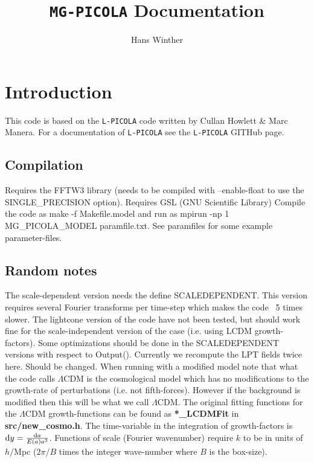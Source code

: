 \documentclass[usenatbib]{article}
\title{\texttt{MG-PICOLA} Documentation}
\author{Hans Winther}
\begin{document}
\maketitle

\section*{Introduction}

This code is based on the \texttt{L-PICOLA} code written by Cullan Howlett \& Marc Manera. For a documentation of \texttt{L-PICOLA} see the \texttt{L-PICOLA} GITHub page.

\subsection*{Compilation}
Requires the FFTW3 library (needs to be compiled with --enable-float to use the SINGLE\_PRECISION option).
\newline
\newline
Requires GSL (GNU Scientific Library)
\newline
\newline
Compile the code as make -f Makefile.model and run as mpirun -np 1 MG\_PICOLA\_MODEL paramfile.txt. See paramfiles for some example parameter-files.

\subsection*{Random notes}

The scale-dependent version needs the define SCALEDEPENDENT. This version requires several Fourier transforms per time-step which makes the code ~5 times slower.
\newline
\newline
The lightcone version of the code have not been tested, but should work fine for the scale-independent version of the case (i.e. using LCDM growth-factors).
\newline
\newline
Some optimizations should be done in the SCALEDEPENDENT versions with respect to Output(). Currently we recompute the LPT fields twice here. Should be changed.
\newline
\newline
When running with a modified model note that what the code calls $\Lambda$CDM is the cosmological model which has no modifications to the growth-rate of perturbations (i.e. not fifth-forces). However if the background is modified then this will be what we call $\Lambda$CDM.
\newline
\newline
The original fitting functions for the $\Lambda$CDM growth-functions can be found as \textbf{*\_LCDMFit} in \textbf{src/new\_cosmo.h}.
\newline
\newline
The time-variable in the integration of growth-factors is ${\rm d}y = \frac{{\rm d}a}{E(a)a^3}$.
\newline
\newline
Functions of scale (Fourier wavenumber) require $k$ to be in units of $h/$Mpc ($2\pi/B$ times the integer wave-number where $B$ is the box-size).
\end{document}

